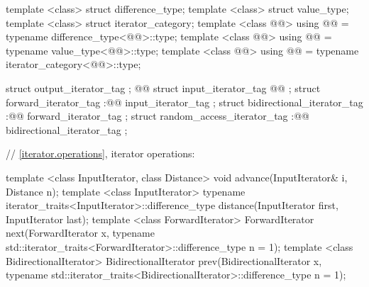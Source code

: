 \begin{addedblock}
\begin{codeblock}
  template <class> struct difference_type;
  template <class> struct value_type;
  template <class> struct iterator_category;
  template <class @@> using @@
    = typename difference_type<@@>::type;
  template <class @@> using @@
    = typename value_type<@@>::type;
  template <class @@> using @@
    = typename iterator_category<@@>::type;

\end{codeblock}
\end{addedblock}
\begin{codeblock}
  struct output_iterator_tag { };
  @@
  struct input_iterator_tag @@{ };
  struct forward_iterator_tag :@@ input_iterator_tag { };
  struct bidirectional_iterator_tag :@@ forward_iterator_tag { };
  struct random_access_iterator_tag :@@ bidirectional_iterator_tag { };

  // \ref{iterator.operations}, iterator operations:
\end{codeblock}
\begin{removedblock}
\begin{codeblock}
  template <class InputIterator, class Distance>
    void advance(InputIterator& i, Distance n);
  template <class InputIterator>
    typename iterator_traits<InputIterator>::difference_type
    distance(InputIterator first, InputIterator last);
  template <class ForwardIterator>
    ForwardIterator next(ForwardIterator x,
      typename std::iterator_traits<ForwardIterator>::difference_type n = 1);
  template <class BidirectionalIterator>
    BidirectionalIterator prev(BidirectionalIterator x,
      typename std::iterator_traits<BidirectionalIterator>::difference_type n = 1);
\end{codeblock}
\end{removedblock}
